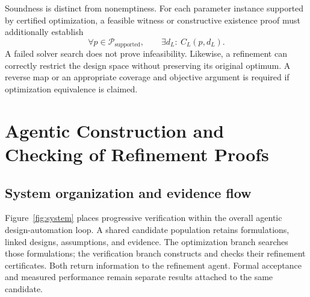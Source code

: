 \documentclass[11pt]{article}
\begin{document}
Soundness is distinct from nonemptiness. For each parameter instance supported by certified optimization, a feasible witness or constructive existence proof must additionally establish
\begin{equation}
 \forall p\in\mathcal P_{\mathrm{supported}},\qquad
 \exists d_L:\ C_L(p,d_L).
 \label{eq:witness}
\end{equation}
A failed solver search does not prove infeasibility. Likewise, a refinement can correctly restrict the design space without preserving its original optimum. A reverse map or an appropriate coverage and objective argument is required if optimization equivalence is claimed.

\section{Agentic Construction and Checking of Refinement Proofs}\label{sec:method}
\subsection{System organization and evidence flow}
Figure~\ref{fig:system} places progressive verification within the overall agentic design-automation loop. A shared candidate population retains formulations, linked designs, assumptions, and evidence. The optimization branch searches those formulations; the verification branch constructs and checks their refinement certificates. Both return information to the refinement agent. Formal acceptance and measured performance remain separate results attached to the same candidate.
\end{document}
